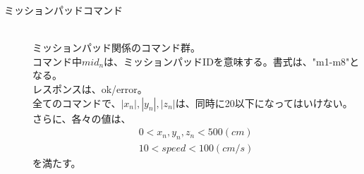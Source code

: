 \documentclass[a4paper, 12pt]{ltjsarticle}
\begin{document}
\begin{description}
\begin{table}[h]
\begin{tabular}{ll}
            \end{tabular}
        \end{table}
        \clearpage
    \item[ミッションパッドコマンド]\mbox{}\\
        ミッションパッド関係のコマンド群。\\
        コマンド中\(mid_n\)は、ミッションパッドIDを意味する。書式は、"m1-m8"となる。\\
        レスポンスは、ok/error。\\
        全てのコマンドで、\(|x_n|,|y_n|,|z_n|\)は、同時に20以下になってはいけない。さらに、各々の値は、
        \begin{eqnarray}
            0 < x_n,y_n,z_n < 500 (cm) \nonumber \\
            10 < speed < 100 (cm/s) \nonumber
        \end{eqnarray}
        を満たす。


\end{description}
\end{document}
